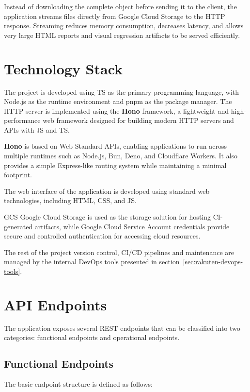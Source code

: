 Instead of downloading the complete object before sending it to the client, the application streams files directly from Google Cloud Storage to the HTTP response. Streaming reduces memory consumption, decreases latency, and allows very large HTML reports and visual regression artifacts to be served efficiently.

\section{Technology Stack}

The project is developed using \acs{TS} as the primary programming language, with Node.js as the runtime environment and pnpm as the package manager. The HTTP server is implemented using the \textbf{Hono} framework, a lightweight and high-performance web framework designed for building modern HTTP servers and APIs with \acs{JS} and \acs{TS}.

\textbf{Hono} is based on Web Standard APIs, enabling applications to run across multiple runtimes such as Node.js, Bun, Deno, and Cloudflare Workers. It also provides a simple Express-like routing system while maintaining a minimal footprint.

The web interface of the application is developed using standard web technologies, including \acs{HTML}, \acs{CSS}, and \acs{JS}.
 
\acf{GCS} Google Cloud Storage is used as the storage solution for hosting \ac{CI}-generated artifacts, while Google Cloud Service Account credentials provide secure and controlled authentication for accessing cloud resources.

The rest of the project version control, \ac{CI}/\acs{CD} pipelines and maintenance are managed by the internal DevOps tools presented in section~\ref{sec:rakuten-devops-tools}.

\section{\acs{API} Endpoints}

The application exposes several REST endpoints that can be classified into two categories: functional endpoints and operational endpoints.

\subsection{Functional Endpoints}

The basic endpoint structure is defined as follows:

